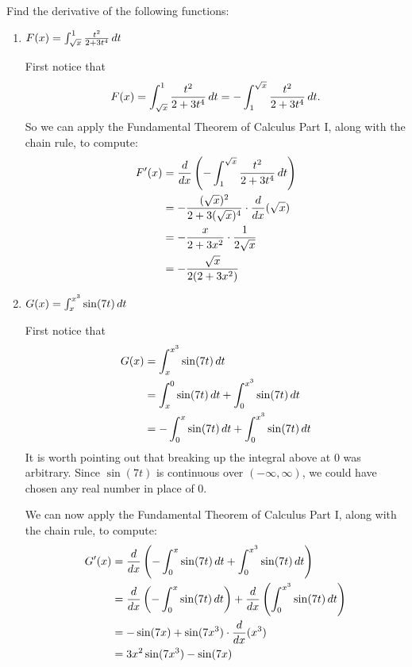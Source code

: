 \documentclass[handout,nooutcomes]{ximera}
\begin{document}
\begin{problem}
Find the derivative of the following functions:
	\begin{multicols}{2}
	\begin{enumerate}
	
	\item  $F(x) = \int_{\sqrt{x}}^1 \frac{t^2}{2 + 3t^4} \,d t$
		\begin{freeResponse}
		First notice that
		$$ F(x) = \int_{\sqrt{x}}^1 \frac{t^2}{2 + 3t^4} \,d t = - \int^{\sqrt{x}}_1 \frac{t^2}{2 + 3t^4} \,d t .$$
		So we can apply the Fundamental Theorem of Calculus Part I, along with the chain rule, to compute:
			\begin{align*}
			F^\prime (x) &= \frac{d}{dx} \left( - \int^{\sqrt{x}}_1 \frac{t^2}{2 + 3t^4} \,d t \right)  \\
			&= - \frac{(\sqrt{x})^2}{2 + 3(\sqrt{x})^4} \cdot \frac{d}{dx}(\sqrt{x})  \\
			&= - \frac{x}{2+3x^2} \cdot \frac{1}{2 \sqrt{x}}  \\
			&= - \frac{\sqrt{x}}{2(2+3x^2)}  
			\end{align*}
		\end{freeResponse}
		
		
		
	\item  $G(x) = \int_x^{x^3} \sin(7t) \,d t$
		\begin{freeResponse}
		First notice that
			\begin{align*}
			G(x) &= \int_x^{x^3} \sin(7t) \,d t  \\
			&= \int_x^0 \sin(7t) \,d t + \int_0^{x^3} \sin(7t) \,d t  \\
			&=  - \int^x_0 \sin(7t) \,d t + \int_0^{x^3} \sin(7t) \,d t
			\end{align*}
		It is worth pointing out that breaking up the integral above at $0$ was arbitrary.  Since $\sin(7t)$ is continuous over $(-\infty, \infty)$, we could have chosen any real number in place of $0$.
		
		We can now apply the Fundamental Theorem of Calculus Part I, along with the chain rule, to compute:
			\begin{align*}
			G^\prime (x) &= \frac{d}{dx} \left( - \int^x_0 \sin(7t) \,d t + \int_0^{x^3} \sin(7t) \,d t \right)  \\
			&= \frac{d}{dx} \left( - \int^x_0 \sin(7t) \,d t \right) + \frac{d}{dx} \left( \int_0^{x^3} \sin(7t) \,d t \right)  \\
			&= -\sin(7x) + \sin(7x^3) \cdot \frac{d}{dx}(x^3)  \\
			&= 3x^2 \sin(7x^3) - \sin(7x)
			\end{align*}
		\end{freeResponse}
		
		
		
	\end{enumerate}
	\end{multicols}	
		
\end{problem}
\end{document}
